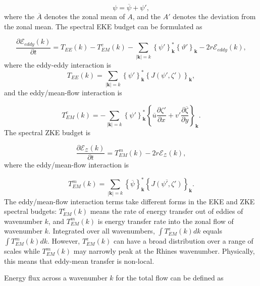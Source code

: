 \documentclass{ametsoc}
\begin{document}
\[
\psi=\overline{\psi}+\psi',
\]
where the $\overline{A}$ denotes the zonal mean of $A$, and the
$A'$ denotes the deviation from the zonal mean. The spectral EKE
budget can be formulated as

\begin{equation}
\frac{\partial\mathcal{E}_{eddy}(k)}{\partial t}=T_{EE}(k)-T_{EM}^{e}(k)-\underset{|\mathbf{k}|=k}{\sum}\left\{ \psi'\right\} _{\mathbf{k}}^{*}\left\{ \vartheta'\right\} _{\mathbf{k}}-2r\mathcal{E}_{eddy}(k),\label{eq:spectral_EKE_budget}
\end{equation}
where the eddy-eddy interaction is 
\begin{equation}
T_{EE}(k)=\underset{|\mathbf{k}|=k}{\sum}\left\{ \psi'\right\} _{\mathbf{k}}^{*}\left\{ J(\psi',\zeta')\right\} _{\mathbf{k}},
\end{equation}
and the eddy/mean-flow interaction is

\begin{equation}
T_{EM}^{e}(k)=-\underset{|\mathbf{k}|=k}{\sum}\left\{ \psi'\right\} _{\mathbf{k}}^{*}\left\{ \overline{u}\frac{\partial\zeta'}{\partial x}+v'\frac{\partial\overline{\zeta}}{\partial y}\right\} _{\mathbf{k}}.
\end{equation}
The spectral ZKE budget is

\begin{equation}
\frac{\partial\mathcal{E}_{\mathcal{Z}}(k)}{\partial t}=T_{EM}^{m}(k)-2r\mathcal{E}_{\mathcal{Z}}(k),\label{eq:spectral_ZKE_budget}
\end{equation}
where the eddy/mean-flow interaction is

\begin{equation}
T_{EM}^{m}(k)=\underset{|\mathbf{k}|=k}{\sum}\left\{ \overline{\psi}\right\} _{\mathbf{k}}^{*}\left\{ \overline{J(\psi',\zeta')}\right\} _{\mathbf{k}}.
\end{equation}
The eddy/mean-flow interaction terms take different forms in the EKE
and ZKE spectral budgets: $T_{EM}^{e}(k)$ means the rate of energy
transfer out of eddies of wavenumber $k$, and $T_{EM}^{m}(k)$ is
energy transfer rate into the zonal flow of wavenumber $k$. Integrated
over all wavenumbers, $\int T_{EM}^{e}(k)dk$ equals $\int T_{EM}^{m}(k)dk$.
However, $T_{EM}^{e}(k)$ can have a broad distribution over a range
of scales while $T_{EM}^{m}(k)$ may narrowly peak at the Rhines wavenumber.
Physically, this means that eddy-mean transfer is non-local.

Energy flux across a wavenumber $k$ for the total flow can be defined
as
\end{document}

